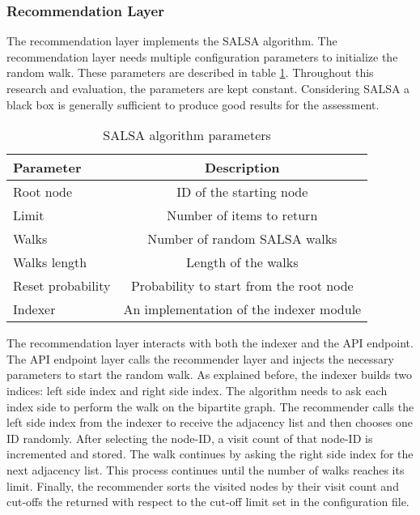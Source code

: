 \subsubsection{Recommendation Layer}
\label{subsubsec:recommendation-layer}
The recommendation layer implements the SALSA \cite{lempelSALSAStochasticApproach2001} algorithm. The recommendation layer needs multiple configuration parameters to initialize the random walk. These parameters are described in table \ref{tab:salsa-parameters}. Throughout this research and evaluation, the parameters are kept constant. Considering SALSA a black box is generally sufficient to produce good results for the assessment.



\begin{table}[!ht]
    \centering
    \caption{SALSA algorithm parameters}
    \label{tab:salsa-parameters}
    \begin{tabular}{|l|c|}
        \hline
        \textbf{Parameter} & \textbf{Description} \\
        \hline
        Root node & ID of the starting node \\
        \hline
        Limit & Number of items to return \\
        \hline
        Walks & Number of random SALSA walks \\
        \hline
        Walks length & Length of the walks \\
        \hline
        Reset probability & Probability to start from the root node \\
        \hline
        Indexer & An implementation of the indexer module \\
        \hline
    \end{tabular}
\end{table}


The recommendation layer interacts with both the indexer and the API endpoint. The API endpoint layer calls the recommender layer and injects the necessary parameters to start the random walk. As explained before, the indexer builds two indices: left side index and right side index. The algorithm needs to ask each index side to perform the walk on the bipartite graph. The recommender calls the left side index from the indexer to receive the adjacency list and then chooses one ID randomly. After selecting the node-ID, a visit count of that node-ID is incremented and stored. The walk continues by asking the right side index for the next adjacency list. This process continues until the number of walks reaches its limit. Finally, the recommender sorts the visited nodes by their visit count and cut-offs the returned with respect to the cut-off limit set in the configuration file.


